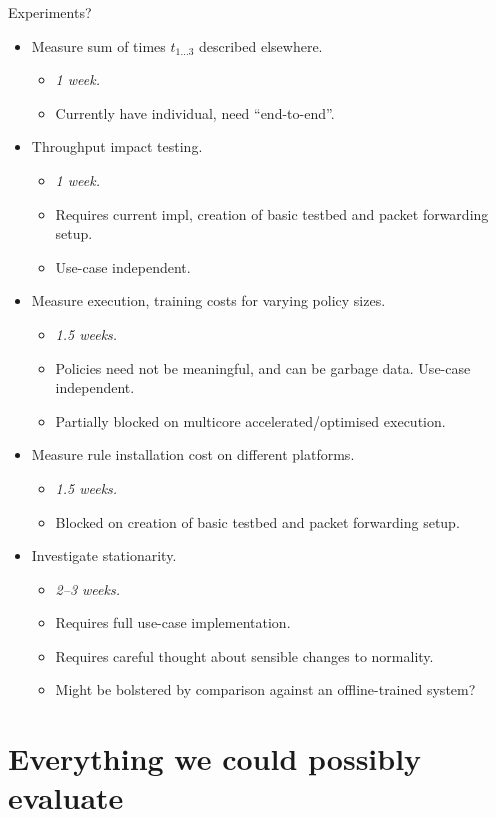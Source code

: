 \documentclass[sigconf,natbib=false]{acmart}
\begin{document}
\begin{appendices}
	Experiments?
	\begin{itemize}
		\item Measure sum of times $t_{1...3}$ described elsewhere.
		\begin{itemize}
			\item \emph{\num{1} week.}
			\item Currently have individual, need ``end-to-end''.
		\end{itemize}
		\item Throughput impact testing.
		\begin{itemize}
			\item \emph{\num{1} week.}
			\item Requires current impl, creation of basic testbed and packet forwarding setup.
			\item Use-case independent.
		\end{itemize}
		\item Measure execution, training costs for varying policy sizes.
		\begin{itemize}
			\item \emph{\num{1.5} weeks.}
			\item Policies need not be meaningful, and can be garbage data. Use-case independent.
			\item Partially blocked on multicore accelerated/optimised execution.
		\end{itemize}
		\item Measure rule installation cost on different platforms.
		\begin{itemize}
			\item \emph{\num{1.5} weeks.}
			\item Blocked on creation of basic testbed and packet forwarding setup.
		\end{itemize}
		\item Investigate stationarity.
		\begin{itemize}
			\item \emph{\numrange{2}{3} weeks.}
			\item Requires full use-case implementation.
			\item Requires careful thought about sensible changes to normality.
			\item Might be bolstered by comparison against an offline-trained system?
		\end{itemize}
	\end{itemize}
	
	\section{Everything we could possibly evaluate}
	

\end{appendices}
\end{document}
